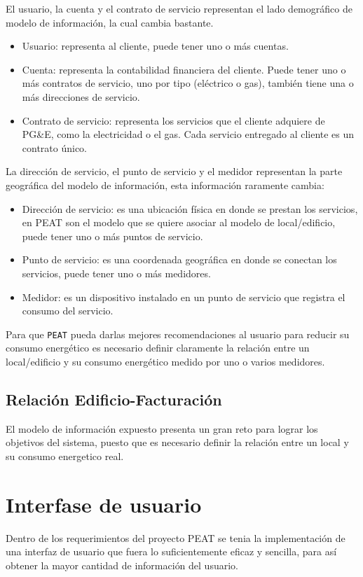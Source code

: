El usuario, la cuenta y el contrato de servicio representan el lado demográfico de modelo de
información, la cual cambia bastante.

\begin{itemize}
\item Usuario: representa al cliente, puede tener uno o más cuentas.
\item Cuenta: representa la contabilidad financiera del cliente. Puede
  tener uno o más contratos de servicio, uno por tipo (eléctrico o gas),
  también tiene una o más direcciones de servicio.
\item Contrato de servicio: representa los servicios que el cliente adquiere
  de PG\&E, como la electricidad o el gas. Cada servicio entregado al cliente
  es un contrato único.
\end{itemize}

La dirección de servicio, el punto de servicio y el medidor representan la parte geográfica
del modelo de información, esta información raramente cambia:

\begin{itemize}
\item Dirección de servicio: es una ubicación física en donde se prestan los servicios, en
  PEAT son el modelo que se quiere asociar al modelo de local/edificio, puede tener
  uno o más puntos de servicio.
\item Punto de servicio: es una coordenada geográfica en donde se conectan los servicios,
  puede tener uno o más medidores.
\item Medidor: es un dispositivo instalado en un punto de servicio que registra el
  consumo del servicio.
\end{itemize}


Para que \texttt{PEAT} pueda darlas mejores recomendaciones al usuario para reducir su consumo
energético es necesario definir claramente la relación entre un local/edificio y su consumo
energético medido por uno o varios medidores.

\subsection{Relación Edificio-Facturación}
El modelo de información expuesto presenta un gran reto para lograr los objetivos del sistema,
puesto que es necesario definir la relación entre un local y su consumo energetico real.

\section{Interfase de usuario}
Dentro de los requerimientos del proyecto PEAT se tenia la implementación de una
interfaz de usuario que fuera lo suficientemente eficaz y sencilla, para así obtener
la mayor cantidad de información del usuario.


